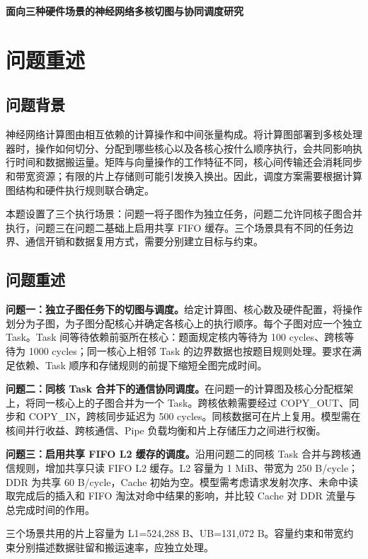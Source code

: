 \documentclass[UTF8,a4paper,zihao=-4]{ctexart}
\numberwithin{equation}{section}
\numberwithin{figure}{section}
\numberwithin{table}{section}
\begin{document}
\begin{center}{\LARGE\bfseries 面向三种硬件场景的神经网络多核切图与协同调度研究\par}\end{center}
\vspace{1em}
\section{问题重述}
\subsection{问题背景}
神经网络计算图由相互依赖的计算操作和中间张量构成。将计算图部署到多核处理器时，操作如何切分、分配到哪些核心以及各核心按什么顺序执行，会共同影响执行时间和数据搬运量。矩阵与向量操作的工作特征不同，核心间传输还会消耗同步和带宽资源；有限的片上存储则可能引发换入换出。因此，调度方案需要根据计算图结构和硬件执行规则联合确定。

本题设置了三个执行场景：问题一将子图作为独立任务，问题二允许同核子图合并执行，问题三在问题二基础上启用共享 FIFO 缓存。三个场景具有不同的任务边界、通信开销和数据复用方式，需要分别建立目标与约束。

\subsection{问题重述}
\textbf{问题一：独立子图任务下的切图与调度。}给定计算图、核心数及硬件配置，将操作划分为子图，为子图分配核心并确定各核心上的执行顺序。每个子图对应一个独立 Task。Task 间等待依赖前驱所在核心：题面规定核内等待为 100 cycles、跨核等待为 1000 cycles；同一核心上相邻 Task 的边界数据也按题目规则处理。要求在满足依赖、Task 顺序和存储规则的前提下缩短全图完成时间。

\textbf{问题二：同核 Task 合并下的通信协同调度。}在问题一的计算图及核心分配框架上，将同一核心上的子图合并为一个 Task。跨核依赖需要经过 COPY\_OUT、同步和 COPY\_IN，跨核同步延迟为 500 cycles。同核数据可在片上复用。模型需在核间并行收益、跨核通信、Pipe 负载均衡和片上存储压力之间进行权衡。

\textbf{问题三：启用共享 FIFO L2 缓存的调度。}沿用问题二的同核 Task 合并与跨核通信规则，增加共享只读 FIFO L2 缓存。L2 容量为 1 MiB、带宽为 250 B/cycle；DDR 为共享 60 B/cycle，Cache 初始为空。模型需考虑请求发射次序、未命中读取完成后的插入和 FIFO 淘汰对命中结果的影响，并比较 Cache 对 DDR 流量与总完成时间的作用。

三个场景共用的片上容量为 L1=524,288 B、UB=131,072 B。容量约束和带宽约束分别描述数据驻留和搬运速率，应独立处理。
\end{document}
